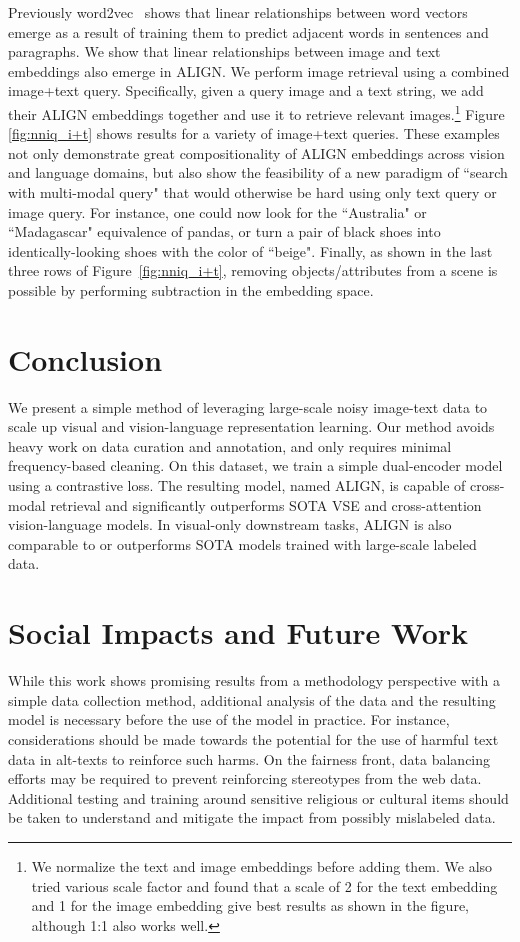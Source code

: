 \documentclass{article}
\begin{document}
Previously word2vec~\cite{mikolov2013efficient, mikolov2013distributed} shows that linear relationships between word vectors emerge as a result of training them to predict adjacent words in sentences and paragraphs. We show that linear relationships between image and text embeddings also emerge in ALIGN. We perform image retrieval using a combined image+text query. Specifically, given a query image and a text string, we add their ALIGN embeddings together and use it to retrieve relevant images.\footnote{We normalize the text and image embeddings before adding them. We also tried various scale factor and found that a scale of 2 for the text embedding and 1 for the image embedding give best results as shown in the figure, although 1:1 also works well.} Figure \ref{fig:nniq_i+t} shows results for a variety of image+text queries. These examples not only demonstrate great compositionality of ALIGN embeddings across vision and language domains, but also show the feasibility of a new paradigm of ``search with multi-modal query" that would otherwise be hard using only text query or image query. For instance, one could now look for the ``Australia" or ``Madagascar" equivalence of pandas, or turn a pair of black shoes into identically-looking shoes with the color of ``beige". Finally, as shown in the last three rows of Figure~\ref{fig:nniq_i+t}, removing objects/attributes from a scene is possible by performing subtraction in the embedding space.


\section{Conclusion}

We present a simple method of leveraging large-scale noisy image-text data to scale up visual and vision-language representation learning. Our method avoids heavy work on data curation and annotation, and only requires minimal frequency-based cleaning. On this dataset, we train a simple dual-encoder model using a contrastive loss. The resulting model, named ALIGN, is capable of cross-modal retrieval and significantly outperforms SOTA VSE and cross-attention vision-language models. In visual-only downstream tasks, ALIGN is also comparable to or outperforms SOTA models trained with large-scale labeled data.

\section{Social Impacts and Future Work}
While this work shows promising results from a methodology perspective with a simple data collection method, additional analysis of the data and the resulting model is necessary before the use of the model in practice. For instance, considerations should be made towards the potential for the use of harmful text data in alt-texts to reinforce such harms. On the fairness front, data balancing efforts may be required to prevent reinforcing stereotypes from the web data. Additional testing and training around sensitive religious or cultural items should be taken to understand and mitigate the impact from possibly mislabeled data.
\end{document}
